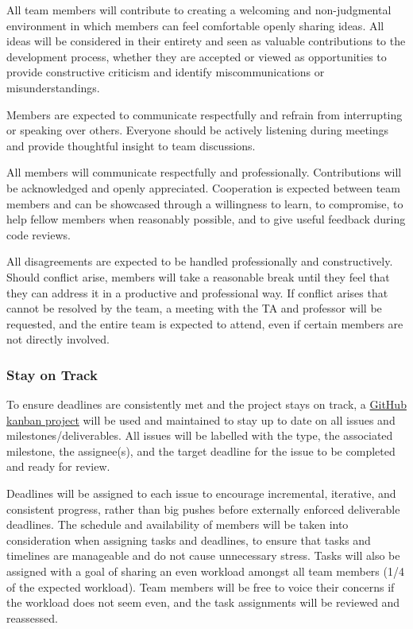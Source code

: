 \documentclass{article}
\begin{document}
All team members will contribute to creating a welcoming and non-judgmental environment in which members can feel comfortable openly sharing ideas. All ideas will be considered in their entirety and seen as valuable contributions to the development process, whether they are accepted or viewed as opportunities to provide constructive criticism and identify miscommunications or misunderstandings.

Members are expected to communicate respectfully and refrain from interrupting or speaking over others. Everyone should be actively listening during meetings and provide thoughtful insight to team discussions.

All members will communicate respectfully and professionally. Contributions will be acknowledged and openly appreciated. Cooperation is expected between team members and can be showcased through a willingness to learn, to compromise, to help fellow members when reasonably possible, and to give useful feedback during code reviews.

All disagreements are expected to be handled professionally and constructively. Should conflict arise, members will take a reasonable break until they feel that they can address it in a productive and professional way. If conflict arises that cannot be resolved by the team, a meeting with the TA and professor will be requested, and the entire team is expected to attend, even if certain members are not directly involved.

\subsubsection*{Stay on Track}

To ensure deadlines are consistently met and the project stays on track, a \href{https://github.com/users/robertLam04/projects/5}{GitHub kanban project} will be used and maintained to stay up to date on all issues and milestones/deliverables. All issues will be labelled with the type, the associated milestone, the assignee(s), and the target deadline for the issue to be completed and ready for review.

Deadlines will be assigned to each issue to encourage incremental, iterative, and consistent progress, rather than big pushes before externally enforced deliverable deadlines. The schedule and availability of members will be taken into consideration when assigning tasks and deadlines, to ensure that tasks and timelines are manageable and do not cause unnecessary stress. Tasks will also be assigned with a goal of sharing an even workload amongst all team members (1/4 of the expected workload). Team members will be free to voice their concerns if the workload does not seem even, and the task assignments will be reviewed and reassessed.
\end{document}
